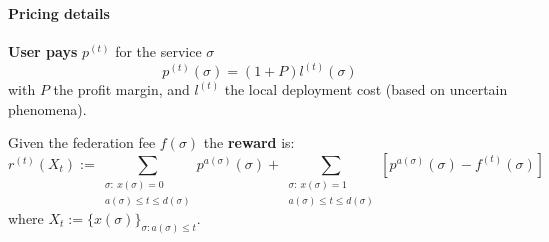 \documentclass[aspectratio=169]{beamer}
\begin{document}
\begin{frame}
    \frametitle{\secname}
    \framesubtitle{Pricing details}

    \textbf{User pays} $p^{(t)}$ for the service $\sigma$
    \begin{equation}
        \mbox{$p^{(t)}(\sigma)=(1+P)l^{(t)}(\sigma)$}
        \label{eq:service-fee}
    \end{equation}
    with $P$ the profit margin, and $l^{(t)}$ the local deployment cost (based on uncertain phenomena).\pause 

    \vfill

    Given the federation fee $f(\sigma)$ the \textbf{reward} is:
    \begin{equation}
        r^{(t)}(X_t) := \!\!\!\!\!\!\!\!\!\!\sum_{\substack{\sigma:~ x(\sigma)=0\\a(\sigma) \le t\le d(\sigma)}} \!\!\!\!\!\!\!\! p^{a(\sigma)}(\sigma) +\!\!\!\!\!\!\!\!\!\! \sum_{\substack{\sigma:~ x(\sigma)=1\\ a(\sigma) \le t\le d(\sigma)}} \!\!\!\!\!\!\!\!\left[ p^{a(\sigma)}(\sigma) - f^{(t)}(\sigma) \right]
        \label{eq:instant-reward}
    \end{equation}
    where $X_t:=\{ x(\sigma) \}_{\sigma: a(\sigma)\le t}$.

\end{frame}
\end{document}
